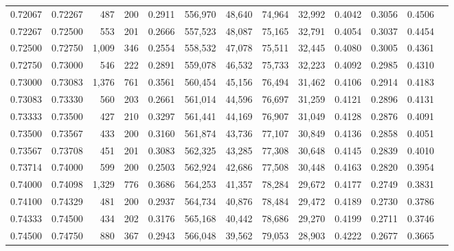 \begin{tabular}{rrrrrrrrrrrrr}
0.72067 & 0.72267 &   487 & 200 &                                     0.2911 & 556,970 &  48,640 &  74,964 &  32,992 & 0.4042 & 0.3056 & 0.4506 \\
0.72267 & 0.72500 &   553 & 201 &                                     0.2666 & 557,523 &  48,087 &  75,165 &  32,791 & 0.4054 & 0.3037 & 0.4454 \\
0.72500 & 0.72750 & 1,009 & 346 &                                     0.2554 & 558,532 &  47,078 &  75,511 &  32,445 & 0.4080 & 0.3005 & 0.4361 \\
0.72750 & 0.73000 &   546 & 222 &                                     0.2891 & 559,078 &  46,532 &  75,733 &  32,223 & 0.4092 & 0.2985 & 0.4310 \\
0.73000 & 0.73083 & 1,376 & 761 &                                     0.3561 & 560,454 &  45,156 &  76,494 &  31,462 & 0.4106 & 0.2914 & 0.4183 \\
0.73083 & 0.73330 &   560 & 203 &                                     0.2661 & 561,014 &  44,596 &  76,697 &  31,259 & 0.4121 & 0.2896 & 0.4131 \\
0.73333 & 0.73500 &   427 & 210 &                                     0.3297 & 561,441 &  44,169 &  76,907 &  31,049 & 0.4128 & 0.2876 & 0.4091 \\
0.73500 & 0.73567 &   433 & 200 &                                     0.3160 & 561,874 &  43,736 &  77,107 &  30,849 & 0.4136 & 0.2858 & 0.4051 \\
0.73567 & 0.73708 &   451 & 201 &                                     0.3083 & 562,325 &  43,285 &  77,308 &  30,648 & 0.4145 & 0.2839 & 0.4010 \\
0.73714 & 0.74000 &   599 & 200 &                                     0.2503 & 562,924 &  42,686 &  77,508 &  30,448 & 0.4163 & 0.2820 & 0.3954 \\
0.74000 & 0.74098 & 1,329 & 776 &                                     0.3686 & 564,253 &  41,357 &  78,284 &  29,672 & 0.4177 & 0.2749 & 0.3831 \\
0.74100 & 0.74329 &   481 & 200 &                                     0.2937 & 564,734 &  40,876 &  78,484 &  29,472 & 0.4189 & 0.2730 & 0.3786 \\
0.74333 & 0.74500 &   434 & 202 &                                     0.3176 & 565,168 &  40,442 &  78,686 &  29,270 & 0.4199 & 0.2711 & 0.3746 \\
0.74500 & 0.74750 &   880 & 367 &                                     0.2943 & 566,048 &  39,562 &  79,053 &  28,903 & 0.4222 & 0.2677 & 0.3665 \\

\end{tabular}
